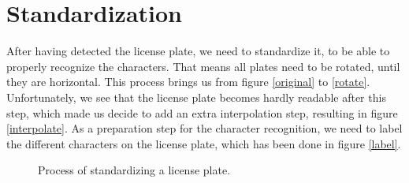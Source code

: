 \documentclass{tudelftposter}
\begin{document}
\section{Standardization}
After having detected the license plate, we need to standardize it, to be able to properly recognize the characters. That means all plates need to be rotated, until they are horizontal. This process brings us from figure \ref{original} to \ref{rotate}. Unfortunately, we see that the license plate becomes hardly readable after this step, which made us decide to add an extra interpolation step, resulting in figure \ref{interpolate}. As a preparation step for the character recognition, we need to label the different characters on the license plate, which has been done in figure \ref{label}. 

\begin{figure}[h]
	\centering
	\caption{Process of standardizing a license plate.}
\end{figure}
\end{document}
